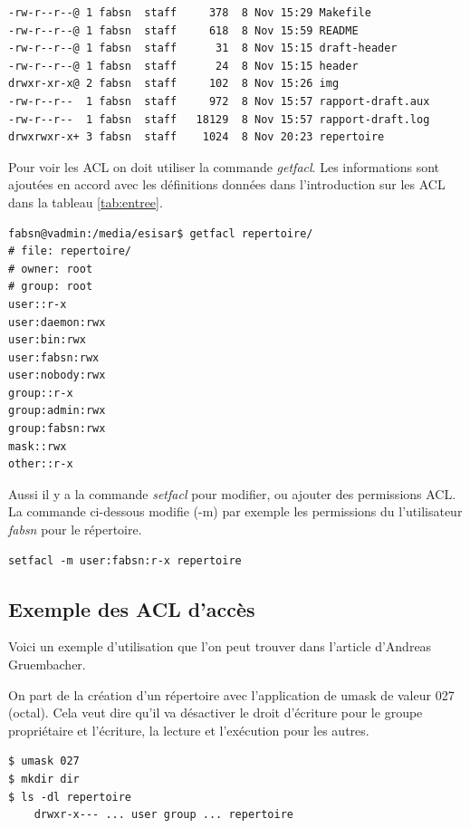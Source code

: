 \documentclass{article}
\begin{document}
\begin{center}
\label{verb:ls}
\begin{verbatim}
-rw-r--r--@ 1 fabsn  staff     378  8 Nov 15:29 Makefile
-rw-r--r--@ 1 fabsn  staff     618  8 Nov 15:59 README
-rw-r--r--@ 1 fabsn  staff      31  8 Nov 15:15 draft-header
-rw-r--r--@ 1 fabsn  staff      24  8 Nov 15:15 header
drwxr-xr-x@ 2 fabsn  staff     102  8 Nov 15:26 img
-rw-r--r--  1 fabsn  staff     972  8 Nov 15:57 rapport-draft.aux
-rw-r--r--  1 fabsn  staff   18129  8 Nov 15:57 rapport-draft.log
drwxrwxr-x+ 3 fabsn  staff	  1024  8 Nov 20:23 repertoire
\end{verbatim}
\end{center}

Pour voir les ACL on doit utiliser la commande \emph{getfacl}. Les informations sont ajoutées en accord avec les définitions données dans l'introduction sur les ACL dans la tableau \ref{tab:entree}. 

\begin{verbatim}
fabsn@vadmin:/media/esisar$ getfacl repertoire/
# file: repertoire/
# owner: root
# group: root
user::r-x
user:daemon:rwx
user:bin:rwx
user:fabsn:rwx
user:nobody:rwx
group::r-x
group:admin:rwx
group:fabsn:rwx
mask::rwx
other::r-x	
\end{verbatim}

Aussi il y a la commande \emph{setfacl} pour modifier, ou ajouter des permissions ACL. La commande ci-dessous modifie (-m) par exemple les permissions du l'utilisateur \emph{fabsn} pour le répertoire. 

\begin{verbatim}
setfacl -m user:fabsn:r-x repertoire
\end{verbatim}


\subsection{Exemple des ACL d'accès}

Voici un exemple d'utilisation que l'on peut trouver dans l'article d'Andreas Gruembacher\cite{aclsuse}.

On part de la création d'un répertoire avec l'application de umask de valeur 027 (octal). Cela veut dire qu'il va désactiver le droit d'écriture pour le groupe propriétaire et l'écriture, la lecture et l'exécution pour les autres.

\begin{verbatim}
$ umask 027 
$ mkdir dir 
$ ls -dl repertoire
	drwxr-x--- ... user group ... repertoire
\end{verbatim}
\end{document}
